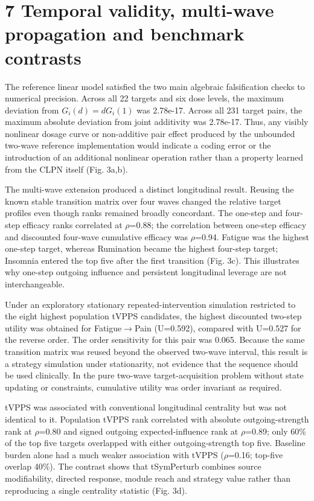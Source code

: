 \documentclass[11pt]{article}
\begin{document}
\section{7 Temporal validity, multi-wave propagation and benchmark
contrasts}\label{temporal-validity-multi-wave-propagation-and-benchmark-contrasts}

The reference linear model satisfied the two main algebraic
falsification checks to numerical precision. Across all 22 targets and
six dose levels, the maximum deviation from \(G_i(d)=dG_i(1)\) was 2.78e-17.
Across all 231 target pairs, the maximum absolute deviation from joint
additivity was 2.78e-17. Thus, any visibly nonlinear dosage curve or
non-additive pair effect produced by the unbounded two-wave reference
implementation would indicate a coding error or the introduction of an
additional nonlinear operation rather than a property learned from the
CLPN itself (Fig. 3a,b).

The multi-wave extension produced a distinct longitudinal result.
Reusing the known stable transition matrix over four waves changed the
relative target profiles even though ranks remained broadly concordant.
The one-step and four-step efficacy ranks correlated at \(\rho\)=0.88; the
correlation between one-step efficacy and discounted four-wave
cumulative efficacy was \(\rho\)=0.94. Fatigue was the highest one-step target,
whereas Rumination became the highest four-step target; Insomnia entered
the top five after the first transition (Fig. 3c). This illustrates why
one-step outgoing influence and persistent longitudinal leverage are not
interchangeable.

Under an exploratory stationary repeated-intervention simulation
restricted to the eight highest population tVPPS candidates, the highest
discounted two-step utility was obtained for Fatigue\(\rightarrow\)Pain (U=0.592),
compared with U=0.527 for the reverse order. The order sensitivity for
this pair was 0.065. Because the same transition matrix was reused
beyond the observed two-wave interval, this result is a strategy
simulation under stationarity, not evidence that the sequence should be
used clinically. In the pure two-wave target-acquisition problem without
state updating or constraints, cumulative utility was order invariant as
required.

tVPPS was associated with conventional longitudinal centrality but was
not identical to it. Population tVPPS rank correlated with absolute
outgoing-strength rank at \(\rho\)=0.80 and signed outgoing expected-influence
rank at \(\rho\)=0.89; only 60\% of the top five targets overlapped with either
outgoing-strength top five. Baseline burden alone had a much weaker
association with tVPPS (\(\rho\)=0.16; top-five overlap 40\%). The contrast
shows that tSymPerturb combines source modifiability, directed response,
module reach and strategy value rather than reproducing a single
centrality statistic (Fig. 3d).
\end{document}
